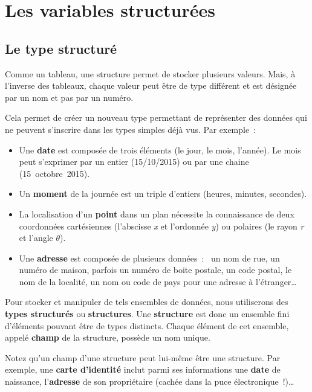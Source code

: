 \chapter{Les variables structurées}

	\section{Le type structuré}
	
		Comme un tableau,
		une structure permet de stocker plusieurs valeurs.
		Mais, à l’inverse des tableaux,
		chaque valeur peut être de type différent
		et est désignée par un nom et pas par un numéro.
		
		Cela permet de créer un nouveau type
		permettant de représenter des données
		qui ne peuvent s’inscrire 
		dans les types simples déjà vus.
		Par exemple~:
		\begin{itemize}
		\item
			Une \textbf{date} est composée de trois éléments (le jour, le mois,
			l’année). Le mois peut s’exprimer par un entier (15/10/2015) 
			ou par une chaine (15~octobre~2015).
		\item
			Un \textbf{moment} de la journée est un triple d’entiers 
			(heures, minutes, secondes).
		\item
			La localisation d’un \textbf{point} dans un plan 
			nécessite la connaissance de deux coordonnées cartésiennes 
			(l’abscisse \textit{x} et l’ordonnée \textit{y}) 
			ou polaires 
			(le rayon \textit{r} et l’angle \textit{$\theta$}).
		\item
			Une \textbf{adresse} est composée de plusieurs données~:~
			un nom de rue, 
			un numéro de maison, 
			parfois un numéro de boite postale, 
			un code postal, 
			le nom de la localité, 
			un nom ou code de pays pour une adresse à l’étranger\dots
		\end{itemize}
	
		Pour stocker et manipuler de tels ensembles de données, 
		nous utiliserons des \textbf{types structurés} 
		ou \textbf{structures}. 
		Une \textbf{structure} est donc un ensemble fini d’éléments 
		pouvant être de types distincts. 
		Chaque élément de cet ensemble, 
		appelé \textbf{champ} de la structure, possède un nom unique.
		
		Notez qu’un champ d’une structure peut lui-même être une structure. 
		Par exemple, une \textbf{carte d’identité} inclut 
		parmi ses informations une \textbf{date} de naissance, 
		l’\textbf{adresse} de son propriétaire 
		(cachée dans la puce électronique~!)\dots
	
